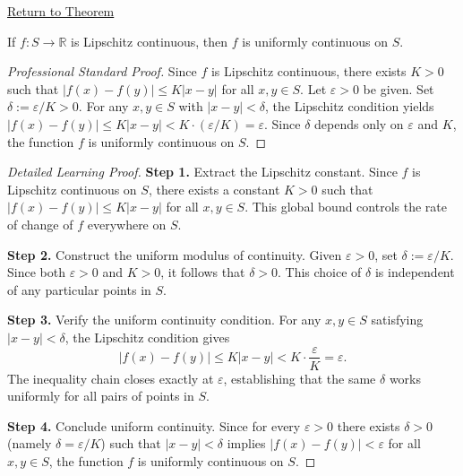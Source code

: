 \newpage
{}
\label{prf:lipschitz-implies-uniform-continuous}

\begin{remark*}[Return]
\hyperref[thm:lipschitz-implies-uniform-continuous]{Return to Theorem}
\end{remark*}

\begin{theorem*}
If $f \colon S \to \mathbb{R}$ is Lipschitz continuous, then $f$ is uniformly continuous on $S$.
\end{theorem*}

\begin{proof}[Professional Standard Proof]
\LRAProofBodyStart
Since $f$ is Lipschitz continuous, there exists $K > 0$ such that $|f(x) - f(y)| \leq K|x - y|$ for all $x, y \in S$. Let $\varepsilon > 0$ be given. Set $\delta := \varepsilon / K > 0$. For any $x, y \in S$ with $|x - y| < \delta$, the Lipschitz condition yields $|f(x) - f(y)| \leq K|x - y| < K \cdot (\varepsilon/K) = \varepsilon$. Since $\delta$ depends only on $\varepsilon$ and $K$, the function $f$ is uniformly continuous on $S$.
\end{proof}

\begin{proof}[Detailed Learning Proof]
\LRAProofBodyStart

\textbf{Step 1.} Extract the Lipschitz constant. Since $f$ is Lipschitz continuous on $S$, there exists a constant $K > 0$ such that $|f(x) - f(y)| \leq K|x - y|$ for all $x, y \in S$. This global bound controls the rate of change of $f$ everywhere on $S$.

\textbf{Step 2.} Construct the uniform modulus of continuity. Given $\varepsilon > 0$, set $\delta := \varepsilon / K$. Since both $\varepsilon > 0$ and $K > 0$, it follows that $\delta > 0$. This choice of $\delta$ is independent of any particular points in $S$.

\textbf{Step 3.} Verify the uniform continuity condition. For any $x, y \in S$ satisfying $|x - y| < \delta$, the Lipschitz condition gives
\[
|f(x) - f(y)| \leq K|x - y| < K \cdot \frac{\varepsilon}{K} = \varepsilon.
\]
The inequality chain closes exactly at $\varepsilon$, establishing that the same $\delta$ works uniformly for all pairs of points in $S$.

\textbf{Step 4.} Conclude uniform continuity. Since for every $\varepsilon > 0$ there exists $\delta > 0$ (namely $\delta = \varepsilon/K$) such that $|x - y| < \delta$ implies $|f(x) - f(y)| < \varepsilon$ for all $x, y \in S$, the function $f$ is uniformly continuous on $S$.
\end{proof}

